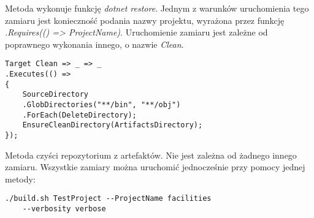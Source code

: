 Metoda wykonuje funkcję \textit{dotnet restore}. Jednym z 
warunków uruchomienia tego zamiaru jest konieczność podania nazwy projektu, wyrażona 
przez funkcję \textit{.Requires(() => ProjectName)}. Uruchomienie zamiaru jest zależne od poprawnego
wykonania innego, o nazwie \textit{Clean}.

\begin{lstlisting}
Target Clean => _ => _
.Executes(() =>
{
    SourceDirectory
    .GlobDirectories("**/bin", "**/obj")
    .ForEach(DeleteDirectory);
    EnsureCleanDirectory(ArtifactsDirectory);
});
\end{lstlisting}

Metoda czyści repozytorium z artefaktów. Nie jest zależna od żadnego innego zamiaru.
Wszystkie zamiary można uruchomić jednocześnie przy pomocy jednej metody:

\begin{lstlisting}
./build.sh TestProject --ProjectName facilities 
    --verbosity verbose
\end{lstlisting}